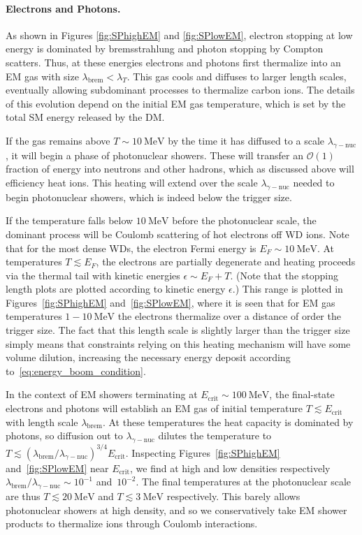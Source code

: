 \documentclass[twocolumn, preprintnumbers,amsmath,amssymb,prd, superscriptaddress]{revtex4}
\newcommand{\OO}{\mathcal{O}}
\newcommand{\MeV}{\text{MeV}}
\begin{document}
\paragraph{Electrons and Photons.}
As shown in  Figures \ref{fig:SPhighEM} and \ref{fig:SPlowEM}, electron stopping at low energy is dominated by bremsstrahlung and photon stopping by Compton scatters.
Thus, at these energies electrons and photons first thermalize into an EM gas with size $\lambda_\text{brem} < \lambda_T$.
This gas cools and diffuses to larger length scales, eventually allowing subdominant processes to thermalize carbon ions.
The details of this evolution depend on the initial EM gas temperature, which is set by the total SM energy released by the DM.

If the gas remains above $T\sim10~\MeV$ by the time it has diffused to a scale $\lambda_{\gamma-\text{nuc}}$, it will begin a phase of photonuclear showers.
These will transfer an $\OO(1)$ fraction of energy into neutrons and other hadrons, which as discussed above will efficiency heat ions.
This heating will extend over the scale $\lambda_{\gamma-\text{nuc}}$ needed to begin photonuclear showers, which is indeed below the trigger size.

If the temperature falls below $10~\MeV$ before the photonuclear scale, the dominant process will be Coulomb scattering of hot electrons off WD ions.
Note that for the most dense WDs, the electron Fermi energy is $E_F \sim 10~\MeV$. At temperatures $T\lesssim E_F$, the electrons are partially degenerate and heating proceeds via the thermal tail with kinetic energies $\epsilon \sim E_F + T$.
(Note that the stopping length plots are plotted according to kinetic energy $\epsilon$.)
This range is plotted in Figures~\ref{fig:SPhighEM} and~\ref{fig:SPlowEM}, where it is seen that for EM gas temperatures $1-10~\MeV$ the electrons thermalize over a distance of order the trigger size.
The fact that this length scale is slightly larger than the trigger size simply means that constraints relying on this heating mechanism will have some volume dilution, increasing the necessary energy deposit according to~\eqref{eq:energy_boom_condition}.

In the context of EM showers terminating at $E_\text{crit}\sim100~\MeV$, the final-state electrons and photons will establish an EM gas of initial temperature $T \lesssim E_\text{crit}$ with length scale $\lambda_\text{brem}$.
At these temperatures the heat capacity is dominated by photons, so diffusion out to $\lambda_{\gamma-\text{nuc}}$ dilutes the temperature to $T \lesssim (\lambda_\text{brem} / \lambda_{\gamma-\text{nuc}})^{3/4} E_\text{crit}$.
Inspecting Figures~\ref{fig:SPhighEM} and~\ref{fig:SPlowEM} near $E_\text{crit}$, we find at high and low densities respectively $\lambda_\text{brem} / \lambda_{\gamma-\text{nuc}} \sim 10^{-1}$ and~$10^{-2}$.
The final temperatures at the photonuclear scale are thus $T \lesssim 20~\text{MeV}$ and $T \lesssim 3~\text{MeV}$ respectively.
This barely allows photonuclear showers at high density, and so we conservatively take EM shower products to thermalize ions through Coulomb interactions.
\end{document}
